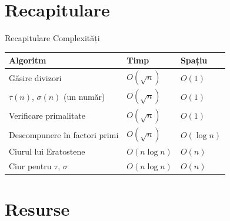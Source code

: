 ﻿\documentclass{beamer}
\begin{document}
\section{Recapitulare}

\begin{frame}{Recapitulare \textemdash{} Complexități}
  \begin{center}
  \begin{tabular}{lll}
    \toprule
    Algoritm & Timp & Spațiu \\
    \midrule
    Găsire divizori                  & $O(\sqrt{n})$      & $O(1)$ \\
    $\tau(n)$, $\sigma(n)$ (un număr) & $O(\sqrt{n})$      & $O(1)$ \\
    Verificare primalitate           & $O(\sqrt{n})$      & $O(1)$ \\
    Descompunere în factori primi    & $O(\sqrt{n})$      & $O(\log n)$ \\
    Ciurul lui Eratostene            & $O(n \log n)$ & $O(n)$ \\
    Ciur pentru $\tau$, $\sigma$     & $O(n \log n)$      & $O(n)$ \\
    \bottomrule
  \end{tabular}
  \end{center}
\end{frame}

\section{Resurse}
\end{document}
